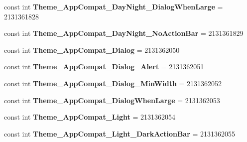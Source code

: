 \begin{DoxyCompactItemize}
const int {\bfseries Theme\+\_\+\+App\+Compat\+\_\+\+Day\+Night\+\_\+\+Dialog\+When\+Large} = 2131361828
\item 
\mbox{\label{class_pinned_app_1_1_droid_1_1_resource_1_1_style_af896a5d9fdc33c1ada7e7fda688a0b5d}} 
const int {\bfseries Theme\+\_\+\+App\+Compat\+\_\+\+Day\+Night\+\_\+\+No\+Action\+Bar} = 2131361829
\item 
\mbox{\label{class_pinned_app_1_1_droid_1_1_resource_1_1_style_a3c267f9707a87d60d214000c537fc887}} 
const int {\bfseries Theme\+\_\+\+App\+Compat\+\_\+\+Dialog} = 2131362050
\item 
\mbox{\label{class_pinned_app_1_1_droid_1_1_resource_1_1_style_a3b7eacc2edd29dfe479ee85c06112a76}} 
const int {\bfseries Theme\+\_\+\+App\+Compat\+\_\+\+Dialog\+\_\+\+Alert} = 2131362051
\item 
\mbox{\label{class_pinned_app_1_1_droid_1_1_resource_1_1_style_a853f33ea2b6ebc7e3bd43d9bf3502166}} 
const int {\bfseries Theme\+\_\+\+App\+Compat\+\_\+\+Dialog\+\_\+\+Min\+Width} = 2131362052
\item 
\mbox{\label{class_pinned_app_1_1_droid_1_1_resource_1_1_style_a06c55a7a4250e95a8dab2b5d4939f836}} 
const int {\bfseries Theme\+\_\+\+App\+Compat\+\_\+\+Dialog\+When\+Large} = 2131362053
\item 
\mbox{\label{class_pinned_app_1_1_droid_1_1_resource_1_1_style_ac45818d68d8f34be70b8aaa41146552b}} 
const int {\bfseries Theme\+\_\+\+App\+Compat\+\_\+\+Light} = 2131362054
\item 
\mbox{\label{class_pinned_app_1_1_droid_1_1_resource_1_1_style_a843cb9d085a8900c6fcce5c80623cead}} 
const int {\bfseries Theme\+\_\+\+App\+Compat\+\_\+\+Light\+\_\+\+Dark\+Action\+Bar} = 2131362055
\item 
\mbox{\label{class_pinned_app_1_1_droid_1_1_resource_1_1_style_a25c0b4bb8f0e787029b83e257587a787}} 

\end{DoxyCompactItemize}
